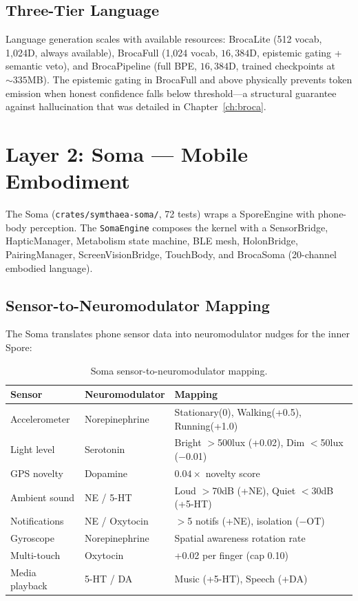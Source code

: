 \documentclass[12pt]{book}
\newcommand{\dimHDC}{16{,}384}
\begin{document}
\subsection{Three-Tier Language}

Language generation scales with available resources: BrocaLite (512 vocab, 1,024D, always available), BrocaFull (1,024 vocab, $\dimHDC$D, epistemic gating + semantic veto), and BrocaPipeline (full BPE, $\dimHDC$D, trained checkpoints at ${\sim}335$MB). The epistemic gating in BrocaFull and above physically prevents token emission when honest confidence falls below threshold---a structural guarantee against hallucination that was detailed in Chapter~\ref{ch:broca}.

\section{Layer 2: Soma --- Mobile Embodiment}

The Soma (\texttt{crates/symthaea-soma/}, 72 tests) wraps a SporeEngine with phone-body perception. The \texttt{SomaEngine} composes the kernel with a SensorBridge, HapticManager, Metabolism state machine, BLE mesh, HolonBridge, PairingManager, ScreenVisionBridge, TouchBody, and BrocaSoma (20-channel embodied language).

\subsection{Sensor-to-Neuromodulator Mapping}

The Soma translates phone sensor data into neuromodulator nudges for the inner Spore:

\begin{table}[H]
\centering
\caption{Soma sensor-to-neuromodulator mapping.}
\label{tab:soma-sensors}
\begin{tabular}{lll}
\toprule
\textbf{Sensor} & \textbf{Neuromodulator} & \textbf{Mapping} \\
\midrule
Accelerometer & Norepinephrine & Stationary(0), Walking(+0.5), Running(+1.0) \\
Light level & Serotonin & Bright $>$500lux (+0.02), Dim $<$50lux ($-$0.01) \\
GPS novelty & Dopamine & $0.04 \times$ novelty score \\
Ambient sound & NE / 5-HT & Loud $>$70dB (+NE), Quiet $<$30dB (+5-HT) \\
Notifications & NE / Oxytocin & $>$5 notifs (+NE), isolation ($-$OT) \\
Gyroscope & Norepinephrine & Spatial awareness rotation rate \\
Multi-touch & Oxytocin & +0.02 per finger (cap 0.10) \\
Media playback & 5-HT / DA & Music (+5-HT), Speech (+DA) \\
\bottomrule
\end{tabular}
\end{table}
\end{document}
